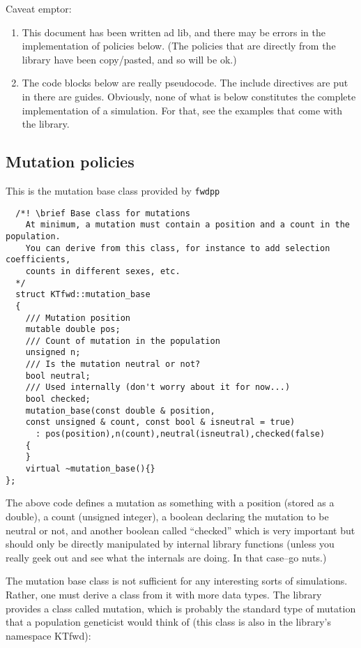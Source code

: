 \documentclass{article}
\begin{document}
Caveat emptor:

\begin{enumerate}
\item This document has been written ad lib, and there may be errors in the implementation of policies below.  (The policies that are directly from the library have been copy/pasted, and so will be ok.)
\item The code blocks below are really pseudocode.  The include directives are put in there are guides.   Obviously, none of what is below constitutes the complete implementation of a simulation.  For that, see the examples that come with the library.
\end{enumerate}

\subsection{Mutation policies}
This is the mutation base class  provided by \texttt{fwdpp}
\begin{lstlisting}
  /*! \brief Base class for mutations
    At minimum, a mutation must contain a position and a count in the population.	
    You can derive from this class, for instance to add selection coefficients,
    counts in different sexes, etc.
  */
  struct KTfwd::mutation_base
  {
    /// Mutation position
    mutable double pos;
    /// Count of mutation in the population
    unsigned n;
    /// Is the mutation neutral or not?
    bool neutral;
    /// Used internally (don't worry about it for now...)
    bool checked;
    mutation_base(const double & position, 
    const unsigned & count, const bool & isneutral = true)
      : pos(position),n(count),neutral(isneutral),checked(false)
    {	
    }
    virtual ~mutation_base(){}
};
\end{lstlisting}

The above code defines a mutation as something with a position (stored as a double), a count (unsigned integer), a boolean declaring the mutation to be neutral or not, and another boolean called ``checked'' which is very important but should only be directly manipulated by internal library functions (unless you really geek out and see what the internals are doing.  In that case--go nuts.)

The mutation base class is not sufficient for any interesting sorts of simulations.  Rather, one must derive a class from it with more data types.  The library provides a class called mutation, which is probably the standard type of mutation that a population geneticist would think of (this class is also in the library's namespace KTfwd):
\end{document}
